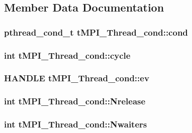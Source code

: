 \subsection{\-Member \-Data \-Documentation}
\hypertarget{structtMPI__Thread__cond_ae2eb826f6e4bbced7a3208e7836487be}{
\subsubsection[{cond}]{\setlength{\rightskip}{0pt plus 5cm}pthread\-\_\-cond\-\_\-t {\bf t\-M\-P\-I\-\_\-\-Thread\-\_\-cond\-::cond}}}\label{structtMPI__Thread__cond_ae2eb826f6e4bbced7a3208e7836487be}
\hypertarget{structtMPI__Thread__cond_a21ace41886012d710ef7accc0580e075}{
\subsubsection[{cycle}]{\setlength{\rightskip}{0pt plus 5cm}int {\bf t\-M\-P\-I\-\_\-\-Thread\-\_\-cond\-::cycle}}}\label{structtMPI__Thread__cond_a21ace41886012d710ef7accc0580e075}
\hypertarget{structtMPI__Thread__cond_a7dd54aee653465790ff96978b83f3887}{
\subsubsection[{ev}]{\setlength{\rightskip}{0pt plus 5cm}\-H\-A\-N\-D\-L\-E {\bf t\-M\-P\-I\-\_\-\-Thread\-\_\-cond\-::ev}}}\label{structtMPI__Thread__cond_a7dd54aee653465790ff96978b83f3887}
\hypertarget{structtMPI__Thread__cond_a396ae8e64192f9a362f6c9b9ab1a2a88}{
\subsubsection[{\-Nrelease}]{\setlength{\rightskip}{0pt plus 5cm}int {\bf t\-M\-P\-I\-\_\-\-Thread\-\_\-cond\-::\-Nrelease}}}\label{structtMPI__Thread__cond_a396ae8e64192f9a362f6c9b9ab1a2a88}
\hypertarget{structtMPI__Thread__cond_ad988b9ceb97398fbd7cacf9719ec4922}{
\subsubsection[{\-Nwaiters}]{\setlength{\rightskip}{0pt plus 5cm}int {\bf t\-M\-P\-I\-\_\-\-Thread\-\_\-cond\-::\-Nwaiters}}}\label{structtMPI__Thread__cond_ad988b9ceb97398fbd7cacf9719ec4922}
